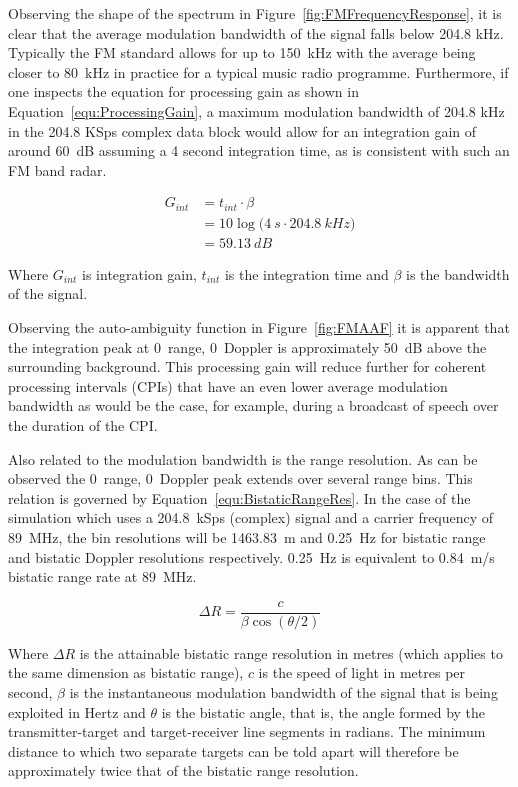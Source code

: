 \documentclass[english, 12pt]{report}
\begin{document}
Observing the shape of the spectrum in Figure~\ref{fig:FMFrequencyResponse}, it is clear that the average modulation bandwidth of the signal falls below 204.8 kHz. Typically the FM standard allows for up to 150~kHz with the average being closer to 80~kHz in practice for a typical music radio programme. Furthermore, if one inspects the equation for processing gain as shown in Equation~\ref{equ:ProcessingGain}, a maximum modulation bandwidth of 204.8 kHz in the 204.8 KSps complex data block would allow for an integration gain of around 60~dB assuming a 4 second integration time, as is consistent with such an FM band radar.

\begin{align}\label{equ:ProcessingGain}
G_{int} & = t_{int} \cdot \beta\\
	    & = 10 \log{\bigg(4~s \cdot 204.8~kHz\bigg)}\\
	    & = 59.13~dB
\end{align}

Where $G_{int}$ is integration gain, $t_{int}$ is the integration time and $\beta$ is the bandwidth of the signal.

Observing the auto-ambiguity function in Figure~\ref{fig:FMAAF} it is apparent that the integration peak at 0~range, 0~Doppler is approximately 50~dB above the surrounding background. This processing gain will reduce further for coherent processing intervals (CPIs) that have an even lower average modulation bandwidth as would be the case, for example, during a broadcast of speech over the duration of the CPI.

Also related to the modulation bandwidth is the range resolution. As can be observed the 0~range, 0~Doppler peak extends over several range bins. This relation is governed by Equation~\ref{equ:BistaticRangeRes}. In the case of the simulation which uses a 204.8~kSps (complex) signal and a carrier frequency of 89~MHz, the bin resolutions will be 1463.83~m and 0.25~Hz for bistatic range and bistatic Doppler resolutions respectively. 0.25~Hz is equivalent to 0.84~m/s bistatic range rate at 89~MHz.

\begin{equation}\label{equ:BistaticRangeRes}
\Delta R = \frac{c}{\beta \cos{  (\theta / 2 )}}
\end{equation}

Where $\Delta R$ is the attainable bistatic range resolution in metres (which applies to the same dimension as bistatic range), $c$ is the speed of light in metres per second, $\beta$ is the instantaneous modulation bandwidth of the signal that is being exploited in Hertz and $\theta$ is the bistatic angle, that is, the angle formed by the transmitter-target and target-receiver line segments in radians. The minimum distance to which two separate targets can be told apart will therefore be approximately twice that of the bistatic range resolution.
\end{document}
